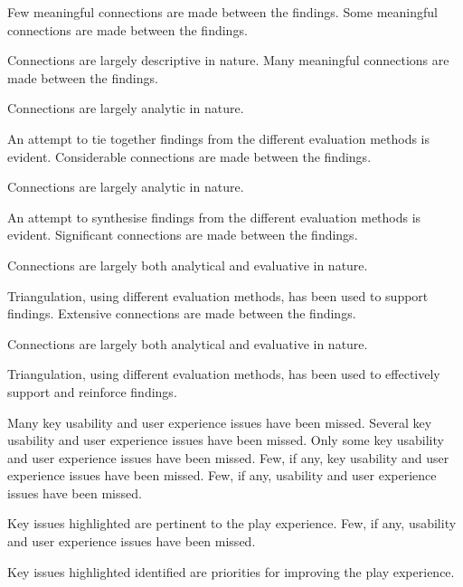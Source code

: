\documentclass{../../fal_assignment}
\begin{document}
\begin{markingrubric}
        \grade \fail	Few meaningful connections are made between the findings.
        \grade 		Some meaningful connections are made between the findings.
        \par     		Connections are largely descriptive in nature.
        \grade		Many meaningful connections are made between the findings.
        \par     		Connections are largely analytic in nature.
        \par		An attempt to tie together findings from the different evaluation methods is evident.
        \grade		Considerable connections are made between the findings.
        \par     		Connections are largely analytic in nature.
        \par		An attempt to synthesise findings from the different evaluation methods is evident.
        \grade		Significant connections are made between the findings.
        \par		Connections are largely both analytical and evaluative in nature.
        \par		Triangulation, using different evaluation methods, has been used to support findings.
        \grade		Extensive connections are made between the findings.
        \par		Connections are largely both analytical and evaluative in nature.
        \par		Triangulation, using different evaluation methods, has been used to effectively support and reinforce findings.
    
        \grade\fail 	Many key usability and user experience issues have been missed.
        \grade		Several key usability and user experience issues have been missed.
        \grade		Only some key usability and user experience issues have been missed.
        \grade		Few, if any, key usability and user experience issues have been missed.
        \grade		Few, if any, usability and user experience issues have been missed.
        \par		Key issues highlighted are pertinent to the play experience.
        \grade		Few, if any, usability and user experience issues have been missed.
        \par		Key issues highlighted identified are priorities for improving the play experience.
      

\end{markingrubric}
\end{document}
